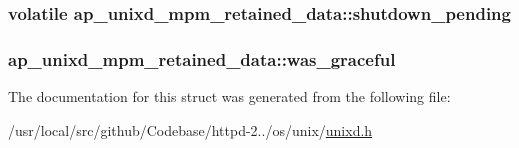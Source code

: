 \subsubsection[{\texorpdfstring{shutdown\+\_\+pending}{shutdown_pending}}]{ volatile ap\+\_\+unixd\+\_\+mpm\+\_\+retained\+\_\+data\+::shutdown\+\_\+pending}\hypertarget{structap__unixd__mpm__retained__data_afabf37de3a13160b2137731cf3e0e5f2}{}\label{structap__unixd__mpm__retained__data_afabf37de3a13160b2137731cf3e0e5f2}
\subsubsection[{\texorpdfstring{was\+\_\+graceful}{was_graceful}}]{ ap\+\_\+unixd\+\_\+mpm\+\_\+retained\+\_\+data\+::was\+\_\+graceful}\hypertarget{structap__unixd__mpm__retained__data_a32217b5b6d7298bd9ee6d1df7430b808}{}\label{structap__unixd__mpm__retained__data_a32217b5b6d7298bd9ee6d1df7430b808}


The documentation for this struct was generated from the following file\+:\begin{DoxyCompactItemize}
\item 
/usr/local/src/github/\+Codebase/httpd-\/2../os/unix/\hyperlink{unixd_8h}{unixd.\+h}\end{DoxyCompactItemize}
